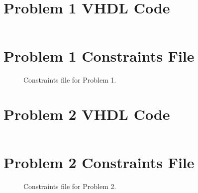 \documentclass[11pt]{article}
\begin{document}
\begin{appendices}

\section{Problem 1 VHDL Code}

\begin{lstlisting}[language=VHDL]

\end{lstlisting}

\section{Problem 1 Constraints File}
\begin{figure}[H]
\begin{center}
	\caption{\label{fig:Part1ConstFile}Constraints file for Problem 1.}
\end{center}
\end{figure}

\section{Problem 2 VHDL Code}
\begin{lstlisting}[language=VHDL]

\end{lstlisting}

\section{Problem 2 Constraints File}
\begin{figure}[H]
\begin{center}
	\caption{\label{fig:Part2ConstFile}Constraints file for Problem 2.}
\end{center}
\end{figure}

\end{appendices}
\end{document}

